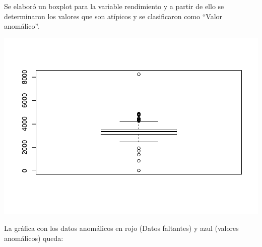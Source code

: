 \documentclass[]{article}
\newenvironment{Shaded}{\begin{snugshade}}{\end{snugshade}}
\newcommand{\KeywordTok}[1]{\textcolor[rgb]{0.13,0.29,0.53}{\textbf{#1}}}
\newcommand{\DecValTok}[1]{\textcolor[rgb]{0.00,0.00,0.81}{#1}}
\newcommand{\StringTok}[1]{\textcolor[rgb]{0.31,0.60,0.02}{#1}}
\newcommand{\CommentTok}[1]{\textcolor[rgb]{0.56,0.35,0.01}{\textit{#1}}}
\newcommand{\OperatorTok}[1]{\textcolor[rgb]{0.81,0.36,0.00}{\textbf{#1}}}
\newcommand{\NormalTok}[1]{#1}
\begin{document}
Se elaboró un boxplot para la variable rendimiento y a partir de ello se
determinaron los valores que son atípicos y se clasificaron como ``Valor
anomálico''.

\begin{Shaded}
\end{Shaded}

\includegraphics{practica1_files/figure-latex/unnamed-chunk-9-1.pdf}

\begin{Shaded}
\end{Shaded}

La gráfica con los datos anomálicos en rojo (Datos faltantes) y azul
(valores anomálicos) queda:
\end{document}
